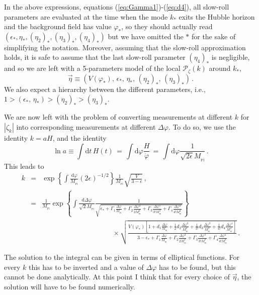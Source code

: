\documentclass[prd, onecolumn, floatfix, letterpaper, nofootinbib, amsmath, amssymb, superscriptaddress]{revtex4}
\renewcommand{\(}{\left(}
\renewcommand{\)}{\right)}
\renewcommand{\[}{\left[}
\renewcommand{\]}{\right]}
\def\be{\begin{equation}}
\def\ee{\end{equation}}
\def\bea{\begin{eqnarray}}
\def\eea{\end{eqnarray}}
\newcommand{\Mp}{M_{_\mathrm{Pl}}}
\begin{document}
In the above expressions, equations (\ref{eq:Gamma1})-(\ref{eq:d4}), all slow-roll parameters are evaluated at the time when the mode $k_*$ exits the Hubble horizon and the background field has value $\varphi_*$, so they should actually read $(\epsilon_*, \eta_*, (\eta_2)_*, (\eta_3)_*, (\eta_4)_*)$ but we have omitted the $*$ for the sake of simplifying the notation. Moreover, assuming that the slow-roll approximation holds, it is safe to assume that the last slow-roll parameter $ (\eta_4)_*$ is negligible, and so we are left with a 5-parameters model of the local $\mathcal{P}_\zeta(k)$ around $k_*$,
\be
	\vec{\eta}\equiv\left(V(\varphi_*),\, \epsilon_*, \,\eta_*, \, (\eta_2)_*, \,(\eta_3)_*\right)\,.
\ee
We also expect a hierarchy between the different parameters, i.e., $1> (\epsilon_*, \,\eta_*)> (\eta_2)_*>(\eta_3)_*$.

\bigskip

We are now left with the problem of converting measurements at different $k$ for $|\zeta_k|$ into corresponding measurements at different $\Delta\varphi$. To do so, we use the identity $k=aH$, and the identity
\be
	\ln a \equiv \int  \mathrm{d}t \, H(t) \, = \, \int  \mathrm{d}\varphi \frac{H}{\dot\varphi}\, =\, \int \mathrm{d}\varphi \frac{1}{\sqrt{2\epsilon}\Mp}\, .
\ee
This leads to
\bea
	k&=&\exp\left\{ \int \frac{\mathrm{d}\varphi}{\Mp}(2\epsilon)^{-1/2}  \right\}\frac{1}{\Mp}\sqrt{\frac{V}{3-\epsilon}}\, ,\\
		&=&  \frac{1}{\Mp}\exp\left\{ \int \frac{\mathrm{d}\Delta\varphi}{\sqrt{2}\Mp}\frac{1}{\sqrt{\epsilon_*+\Gamma_1\frac{\Delta\varphi}{\Mp}+\Gamma_2\frac{\Delta\varphi^2}{2\Mp^2} +\Gamma_3\frac{\Delta\varphi^3}{3!\Mp^3}+\Gamma_4\frac{\Delta\varphi^4}{4!\Mp^4} }}  \right\}
		\nonumber
		\\
		\label{eq:kDeltavarphimapping}
		&&\qquad\qquad\qquad \qquad \qquad\times \sqrt{\frac{V(\varphi_*)\left[1+d_1\frac{\Delta\varphi}{\Mp}+\frac{1}{2}d_2\frac{\Delta\varphi^2}{\Mp^2}+\frac{1}{3!}d_3\frac{\Delta\varphi^3}{\Mp^3} +\frac{1}{4!}d_4\frac{\Delta\varphi^4}{\Mp^4}\right]}{3-\epsilon_*+\Gamma_1\frac{\Delta\varphi}{\Mp}+\Gamma_2\frac{\Delta\varphi^2}{2\Mp^2} +\Gamma_3\frac{\Delta\varphi^3}{3!\Mp^3}+\Gamma_4\frac{\Delta\varphi^4}{4!\Mp^4} }}  \,  .
\eea
 
 The solution to the integral can be given in terms of elliptical functions. For every $k$ this has to be inverted and a value of $\Delta \varphi$ has to be found, but this cannot be done analytically. At this point I think that for every choice of $\vec{\eta}$, the solution will have to be found numerically.
 
\end{document}
